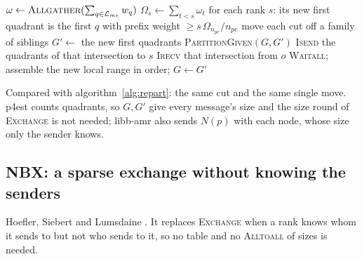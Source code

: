 \begin{algorithm}[H]
  \caption{}
  \label{alg:p4est}
  \begin{algorithmic}[1]
    \State $\omega \gets \textsc{Allgather}(\sum_{q \in \mathcal{L}_{me}} w_q)$
    \State $\Omega_s \gets \sum_{t < s} \omega_t$ 
    \State for each rank $s$: its new first quadrant is the first $q$ with
      prefix weight $\ge s\,\Omega_{n_{pe}} / n_{pe}$
    \Statex {}
      \State move each cut off a family of siblings
    \EndIf
    \State $G' \gets$ the new first quadrants 
    \State \textsc{PartitionGiven}$(G, G')$
    \State {} 
    \Statex
      \For{each rank $s$ with $[G'_s, G'_{s+1}) \cap [G_{me}, G_{me+1}) \ne
        \emptyset$, $s \ne me$}
        \State \textsc{Isend} the quadrants of that intersection to $s$
      \EndFor
      \For{each rank $o$ with $[G_o, G_{o+1}) \cap [G'_{me}, G'_{me+1}) \ne
        \emptyset$, $o \ne me$}
        \State \textsc{Irecv} that intersection from $o$
      \EndFor
      \State \textsc{Waitall};\; assemble the new local range in order;\;
        $G \gets G'$
    \EndFunction
  \end{algorithmic}
\end{algorithm}

Compared with algorithm~\ref{alg:repart}: the same cut and the same single
move. p4est counts quadrants, so $G, G'$ give every message's size and
the size round of \textsc{Exchange} is not needed; libb-amr also sends
$N(p)$ with each node, whose size only the sender knows.

\subsection{NBX: a sparse exchange without knowing the senders}

Hoefler, Siebert and Lumsdaine \cite{nbx}. It replaces \textsc{Exchange}
when a rank knows whom it sends to but not who sends to it, so no table
and no \textsc{Alltoall} of sizes is needed.

